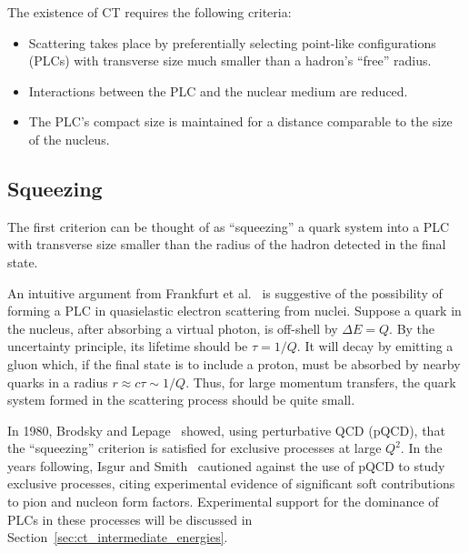 The existence of CT requires the following criteria:
\begin{itemize}
    \item Scattering takes place by preferentially selecting point-like
          configurations (PLCs) with transverse size much smaller than a
          hadron's ``free'' radius.
    \item Interactions between the PLC and the nuclear medium are reduced.
    \item The PLC's compact size is maintained for a distance comparable to the
          size of the nucleus.
\end{itemize}


\subsection{Squeezing}
The first criterion can be thought of as ``squeezing'' a quark system into a
PLC with transverse size smaller than the radius of the hadron detected in
the final state.


An intuitive argument from Frankfurt et al.~\cite{Frankfurt_1992} is suggestive
of the possibility of forming a PLC in quasielastic electron scattering from
nuclei.
Suppose a quark in the nucleus, after absorbing a virtual photon, is off-shell
by $\Delta E = Q$.
By the uncertainty principle, its lifetime should be $\tau=1/Q$.
It will decay by emitting a gluon which, if the final state is to include a
proton, must be absorbed by nearby quarks in a radius
$r \approx c \tau \sim 1/Q$.
Thus, for large momentum transfers, the quark system formed in the scattering
process should be quite small.


In 1980, Brodsky and Lepage~\cite{Brodsky_1980, Lepage_1980} showed, using
perturbative QCD (pQCD), that the ``squeezing'' criterion is satisfied for
exclusive processes at large $Q^2$.
In the years following, Isgur and Smith~\cite{Isgur_1984, Isgur_1988,
Isgur_1989} cautioned against the use of pQCD to study exclusive processes,
citing experimental evidence of significant soft contributions to pion and
nucleon form factors.
Experimental support for the dominance of PLCs in these processes will be
discussed in Section~\ref{sec:ct_intermediate_energies}.


